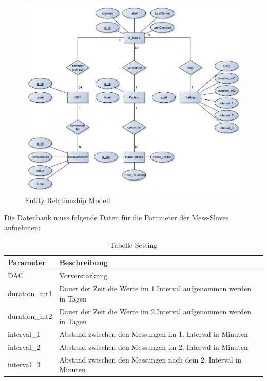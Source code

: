 \begin{figure}[H]
\begin{center}
\includegraphics[width=\textwidth]{img/general/ER_Diagramm.pdf}
\caption{Entity Relationship Modell}
\label{ERM}
\end{center}
\end{figure}


Die Datenbank muss folgende Daten für die Parameter der Mess-Slaves aufnehmen:\\

\begin{table}[h]
\begin{center}
\begin{tabular}{|l|l|}\hline
Parameter & Beschreibung \\ \hline
DAC & Vorverstärkung\\ 
duration\_int1 & Dauer der Zeit die Werte im 1.Interval aufgenommen werden in Tagen\\ 
duration\_int2 & Dauer der Zeit die Werte im 2.Interval aufgenommen werden in Tagen\\ 
interval\_1 & Abstand zwischen den Messungen im 1. Interval in Minuten\\ 
interval\_2 & Abstand zwischen den Messungen im 2. Interval in Minuten\\ 
interval\_3 & Abstand zwischen den Messungen nach dem 2. Interval in Minuten\\ \hline
\end{tabular}
\caption{Tabelle Setting}
\label{table_TabelleSetting}
\end{center}
\end{table}




